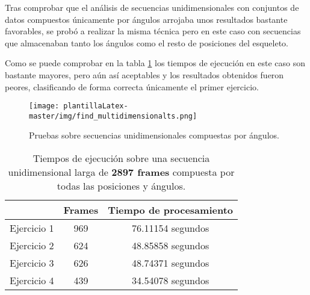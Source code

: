 Tras comprobar que el análisis de secuencias unidimensionales con conjuntos de datos compuestos únicamente por ángulos arrojaba unos resultados bastante favorables, se probó a realizar la misma técnica pero en este caso con secuencias que almacenaban tanto los ángulos como el resto de posiciones del esqueleto. 

Como se puede comprobar en la tabla \ref{tiempos3} los tiempos de ejecución en este caso son bastante mayores, pero aún así aceptables y los resultados obtenidos fueron peores, clasificando de forma correcta únicamente el primer ejercicio. 

\begin{figure}[H]
    \centering
    \texttt{[image: plantillaLatex-master/img/find\_multidimensionalts.png]}
    \caption{Pruebas sobre secuencias unidimensionales compuestas por ángulos.}
    \label{fig:angprubuni}
    
\end{figure}
\begin{table}[H]
\centering
\begin{tabular}{lcc}
\hline
\rowcolor[HTML]{EFEFEF} 
\multicolumn{1}{c}{\cellcolor[HTML]{EFEFEF}\textbf{Ejercicio}} & \multicolumn{1}{l}{\cellcolor[HTML]{EFEFEF}\textbf{Frames}} & \multicolumn{1}{l}{\cellcolor[HTML]{EFEFEF}\textbf{Tiempo de procesamiento}} \\ \hline
\rowcolor[HTML]{ECF4FF} 
Ejercicio 1                                                    & 969                                                         & 76.11154 segundos                                                            \\
\rowcolor[HTML]{EFEFEF} 
Ejercicio 2                                                    & 624                                                         & 48.85858 segundos                                                            \\
\rowcolor[HTML]{ECF4FF} 
Ejercicio 3                                                    & 626                                                         & 48.74371 segundos                                                            \\
\rowcolor[HTML]{EFEFEF} 
Ejercicio 4                                                    & 439                                                         & 34.54078 segundos                                                            \\ \hline
\end{tabular}
\caption{Tiempos de ejecución sobre una secuencia unidimensional larga de \textbf{2897 frames} compuesta por todas las posiciones y ángulos.}
\label{tiempos3}
\end{table}

